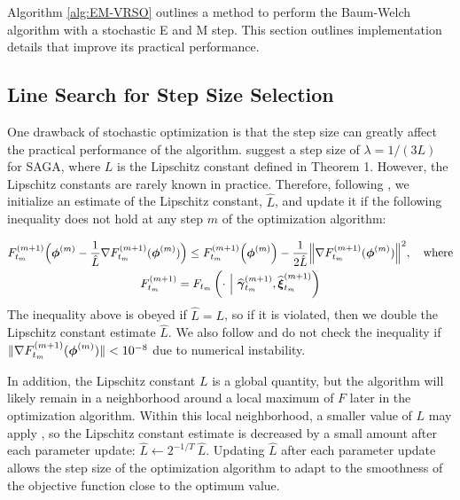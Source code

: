 
Algorithm \ref{alg:EM-VRSO} outlines a method to perform the Baum-Welch algorithm with a stochastic E and M step. This section outlines implementation details that improve its practical performance.

\subsection{Line Search for Step Size Selection}
\label{subsec:est_L}

One drawback of stochastic optimization is that the step size can greatly affect the practical performance of the algorithm. %
\citet{Defazio:2014} suggest a step size of $\lambda = 1/(3L)$ for SAGA, where $L$ is the Lipschitz constant defined in Theorem 1. However, the Lipschitz constants are rarely known in practice. Therefore, following \citet{Schmidt:2017}, we initialize an estimate of the Lipschitz constant, $\hat L$, and update it if the following inequality does not hold at any step $m$ of the optimization algorithm:

\begin{gather}
    F^{(m+1)}_{t_m}\Big(\boldsymbol{\phi}^{(m)} - \frac{1}{\hat L} \nabla F_{t_m}^{(m+1)}(\boldsymbol{\phi}^{(m)}) \Big) \leq F^{(m+1)}_{t_m}\Big(\boldsymbol{\phi}^{(m)}\Big) - \frac{1}{2 \hat L} \Big\| \nabla F_{t_m}^{(m+1)}(\boldsymbol{\phi}^{(m)}) \Big\| ^2, \quad \text{where} \nonumber \\
    F_{t_m}^{(m+1)} = F_{t_m}\left(\cdot ~ \Big | ~ \widehat {\boldsymbol{\gamma}}^{(m+1)}_{t_m}, \widehat {\boldsymbol{\xi}}^{(m+1)}_{t_m}\right)
    \label{ineq:F}
\end{gather}
%
The inequality above is obeyed if $\hat L = L$, so if it is violated, then we double the Lipschitz constant estimate $\hat L$. We also follow \citet{Schmidt:2017} and do not check the inequality if $\| \nabla F_{t_m}^{(m+1)}(\boldsymbol{\phi}^{(m)})\| < 10^{-8}$ due to numerical instability. 

In addition, the Lipschitz constant $L$ is a global quantity, but the algorithm will likely remain in a neighborhood around a local maximum of $F$ later in the optimization algorithm. Within this local neighborhood, a smaller value of $L$ may apply \citep{Schmidt:2017}, so the Lipschitz constant estimate is decreased by a small amount after each parameter update:
%
$\hat L \leftarrow 2^{-1/T} ~ \hat L$.
%
Updating $\hat L$ after each parameter update allows the step size of the optimization algorithm to adapt to the smoothness of the objective function close to the optimum value.

